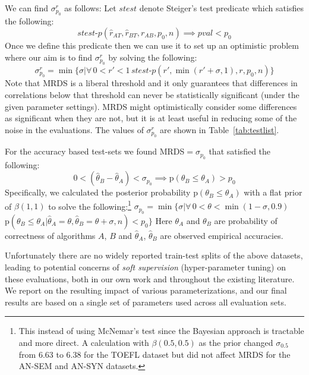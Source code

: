 \documentclass[11pt]{article}
\begin{document}
We can find $\sigma_{p_0}^r$ as follows: Let $\textit{stest}$
denote Steiger's test predicate which satisfies the following:
$$\textit{stest-p}(\hat{r}_{AT}, \hat{r}_{BT}, r_{AB}, p_0, n)
{\implies} \textit{pval} < p_0$$ Once we define this predicate then we
can use it to set up an optimistic problem where our aim is to find
$\sigma_{p_0}^r$ by solving the following: {\small $$\sigma_{p_0}^r =
  \min\{\sigma | \forall\, 0 {<} r' {<} 1\, \textit{stest-p}(r',
  \min(r'+\sigma, 1), r, p_0, n) \} $$} Note that MRDS is a liberal
threshold and it only guarantees that differences in correlations
below that threshold can never be statistically significant (under the
given parameter settings). MRDS might optimistically consider some
differences as significant when they are not, but it is at least
useful in reducing some of the noise in the evaluations.  The values
of $\sigma_{p_0}^r$ are shown in Table~\ref{tab:testlist}.

For the accuracy based test-sets we found MRDS$=\sigma_{p_0}$ that satisfied
the following:
{\small $$ 0< (\hat{\theta}_{B} - \hat{\theta}_{A})<\sigma_{p_0}
  {\implies} \text{p}(\theta_{B} \le \theta_{A}) > p_0$$}
Specifically, we calculated the posterior probability
$\text{p}(\theta_{B} \le \theta_{A})$ with a flat prior of
$\beta(1,1)$ to solve the following:\footnote{This instead of using  McNemar's test
  \cite{mcnemar1947note} since the Bayesian approach is tractable and
  more direct. A calculation with $\beta(0.5, 0.5)$ as the prior
  changed $\sigma_{0.5}$ from 6.63 to 6.38 for the TOEFL dataset but
  did not affect MRDS for the AN-SEM and AN-SYN datasets.}
{\small $\sigma_{p_0}=\min\{\sigma |\forall\,
  0{<}\theta{<}\min(1{-}\sigma,0.9)\,$
  $\text{p}(\theta_{B}{\le} \theta_{A}| \hat{\theta}_A{=}\theta,
\hat{\theta}_B{=}\theta+\sigma, n) < p_0\}$}
Here $\theta_{A}$ and $\theta_{B}$ are probability of correctness of
algorithms $A$, $B$ and $\hat{\theta}_{A}$, $\hat{\theta}_{B}$ are
observed empirical accuracies.

Unfortunately there are no widely reported train-test splits of the
above datasets, leading to potential concerns of \emph{soft
  supervision} (hyper-parameter tuning) on these evaluations, both in
our own work and throughout the existing literature.  We report on the
resulting impact of various parameterizations, and our final results
are based on a single set of parameters used across all evaluation
sets.

\end{document}
